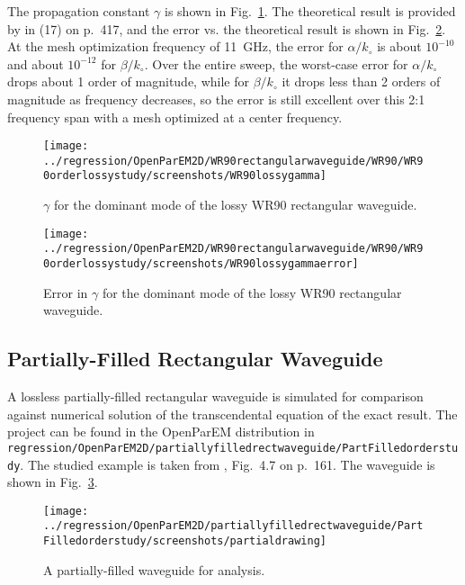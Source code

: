 \documentclass[titlepage]{article}
\renewcommand\_{\textunderscore\linebreak[1]}
\begin{document}
The propagation constant $\gamma$ is shown in Fig.~\ref{fig:WR90_lossy_gamma}.  The theoretical result is provided by \cite{Ramo} in (17) on p.~417, and the error vs. the theoretical result is shown in Fig.~\ref{fig:WR90_lossy_gamma_error}.  At the mesh optimization frequency of 11~GHz, the error for $\alpha/k_{\circ}$ is about $10^{-10}$ and about $10^{-12}$ for $\beta/k_{\circ}$.  Over the entire sweep, the worst-case error for $\alpha/k_{\circ}$ drops about 1 order of magnitude, while for $\beta/k_{\circ}$ it drops less than 2 orders of magnitude as frequency decreases, so the error is still excellent over this 2:1 frequency span with a mesh optimized at a center frequency.

\begin{figure}[H]
  \centering
  \texttt{[image: ../regression/OpenParEM2D/WR90\_rectangular\_waveguide/WR90/WR90\_order\_6\_lossy\_study/screenshots/WR90\_lossy\_gamma]}
  \caption{$\gamma$ for the dominant mode of the lossy WR90 rectangular waveguide.}
  \label{fig:WR90_lossy_gamma}
\end{figure}

\begin{figure}[H]
  \centering
  \texttt{[image: ../regression/OpenParEM2D/WR90\_rectangular\_waveguide/WR90/WR90\_order\_6\_lossy\_study/screenshots/WR90\_lossy\_gamma\_error]}
  \caption{Error in $\gamma$ for the dominant mode of the lossy WR90 rectangular waveguide.}
  \label{fig:WR90_lossy_gamma_error}
\end{figure}

\subsection{Partially-Filled Rectangular Waveguide}

A lossless partially-filled rectangular waveguide is simulated for comparison against numerical solution of the transcendental equation of the exact result. The project can be found in the OpenParEM distribution in \texttt{regression/OpenParEM2D/partially\_filled\_rect\_waveguide/PartFilled\_order\_6\_study}.  The studied example is taken from \cite{Harrington}, Fig.~4.7 on p.~161.  The waveguide is shown in Fig.~\ref{fig:partial_drawing}.
\begin{figure}[H]
  \centering
  \texttt{[image: ../regression/OpenParEM2D/partially\_filled\_rect\_waveguide/PartFilled\_order\_6\_study/screenshots/partial\_drawing]}
  \caption{A partially-filled waveguide for analysis.}
  \label{fig:partial_drawing}
\end{figure}
\end{document}
